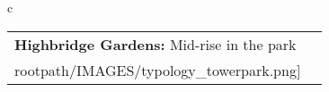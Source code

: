 \begin{table}[H]
        \begin{tabular}{c}
        \begin{tabular}{m{1.5in} m{2in}}
\textbf{Highbridge Gardens:} {Mid-rise in the park} & \texttt{[image: \\rootpath/IMAGES/typology\_towerpark.png]}
\end{tabular}\end{tabular}
        \end{table}